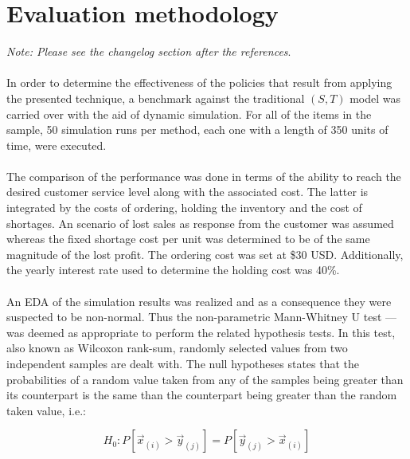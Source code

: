 \documentclass[letterpaper]{article}
\begin{document}
\FloatBarrier

\section*{Evaluation methodology}

\textit{Note: Please see the changelog section after the references}.

\paragraph{}
In order to determine the effectiveness of the policies that result from applying the presented technique, a benchmark against the traditional $(S,T)$ model was carried over with the aid of dynamic simulation. For all of the items in the sample, 50 simulation runs per method, each one with a length of 350 units of time, were executed.

\paragraph{}
 The comparison of the performance was done in terms of the ability to reach the desired customer service level along with the associated cost. The latter is integrated by the costs of ordering, holding the inventory and the cost of shortages. An scenario of lost sales as response from the customer was assumed whereas the fixed shortage cost per unit was determined to be of the same magnitude of the lost profit. The ordering cost was set at \$30 USD. Additionally, the yearly interest rate used to determine the holding cost was 40\%.

\paragraph{}
An EDA of the simulation results was realized and as a consequence they were suspected to be non-normal. Thus the non-parametric Mann-Whitney U test --\cite{mann1947test}-- was deemed as appropriate to perform the related hypothesis tests. In this test, also known as Wilcoxon rank-sum, randomly selected values from two independent samples are dealt with. The null hypotheses states that the probabilities of a random value taken from any of the samples being greater than its counterpart is the same than the counterpart being greater than the random taken value, i.e.:

\begin{equation}
    H_0: P\left[\vec{x}_{(i)}>\vec{y}_{(j)}\right] = P\left[\vec{y}_{(j)}>\vec{x}_{(i)}\right]
\end{equation}
\end{document}
